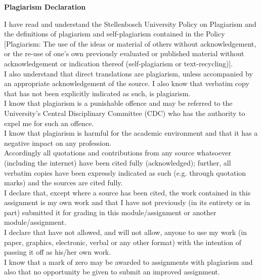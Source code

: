 
\begin{titlingpage}
\begin{center}
	
			\textbf{\Large Plagiarism Declaration}
\end{center}

I have read and understand the Stellenbosch University Policy on Plagiarism and the definitions of plagiarism and self-plagiarism contained in the Policy [Plagiarism: The use of the ideas or material of others without acknowledgement, or the re-use of one's own previously evaluated or published material without acknowledgement or indication thereof (self-plagiarism or text-recycling)].\\

I also understand that direct translations are plagiarism, unless accompanied by an appropriate acknowledgement of the source. I also know that verbatim copy that has not been explicitly indicated as such, is plagiarism.\\

I know that plagiarism is a punishable offence and may be referred to the University's Central Disciplinary Committee (CDC) who has the authority to expel me for such an offence.\\

I know that plagiarism is harmful for the academic environment and that it has a negative impact on any profession.\\

Accordingly all quotations and contributions from any source whatsoever (including the internet) have been cited fully (acknowledged); further, all verbatim copies have been expressly indicated as such (e.g. through quotation marks) and the sources are cited fully.\\

I declare that, except where a source has been cited, the work contained in this assignment is my own work and that I have not previously (in its entirety or in part) submitted it for grading in this module/assignment or another module/assignment.\\

I declare that have not allowed, and will not allow, anyone to use my work (in paper, graphics, electronic, verbal or any other format) with the intention of passing it off as his/her own work.\\

I know that a mark of zero may be awarded to assignments with plagiarism and also that no opportunity be given to submit an improved assignment.\\


\end{titlingpage}
